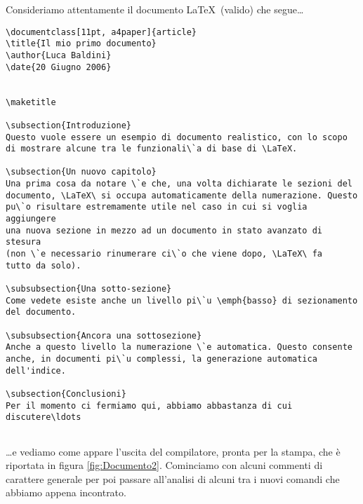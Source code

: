 Consideriamo attentamente il documento \LaTeX\ (valido) che segue\ldots

\begin{verbatim}
\documentclass[11pt, a4paper]{article}
\title{Il mio primo documento}
\author{Luca Baldini}
\date{20 Giugno 2006}


\maketitle

\subsection{Introduzione}
Questo vuole essere un esempio di documento realistico, con lo scopo
di mostrare alcune tra le funzionali\`a di base di \LaTeX.

\subsection{Un nuovo capitolo}
Una prima cosa da notare \`e che, una volta dichiarate le sezioni del
documento, \LaTeX\ si occupa automaticamente della numerazione. Questo
pu\`o risultare estremamente utile nel caso in cui si voglia aggiungere
una nuova sezione in mezzo ad un documento in stato avanzato di stesura
(non \`e necessario rinumerare ci\`o che viene dopo, \LaTeX\ fa
tutto da solo).

\subsubsection{Una sotto-sezione}
Come vedete esiste anche un livello pi\`u \emph{basso} di sezionamento
del documento.

\subsubsection{Ancora una sottosezione}
Anche a questo livello la numerazione \`e automatica. Questo consente
anche, in documenti pi\`u complessi, la generazione automatica dell'indice.

\subsection{Conclusioni}
Per il momento ci fermiamo qui, abbiamo abbastanza di cui discutere\ldots


\end{verbatim}

\noindent \ldots e vediamo come appare l'uscita del compilatore, pronta per
la stampa, che \`e riportata in figura \ref{fig:Documento2}.
Cominciamo con alcuni commenti di carattere generale per poi passare
all'analisi di alcuni tra i nuovi comandi che abbiamo appena incontrato.

